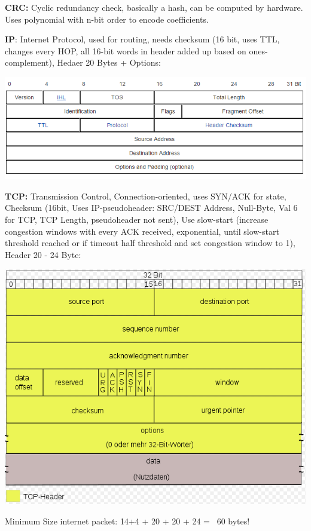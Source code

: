 \textbf{CRC:} Cyclic redundancy check, basically a hash, can be computed by hardware. Uses polynomial with n-bit order to encode coefficients.

\textbf{IP}: Internet Protocol, used for routing, needs checksum (16 bit, uses TTL, changes every HOP, all 16-bit words in header added up based on ones-complement), Hedaer 20 Bytes + Options:

\includegraphics[width=.7\textwidth]{images/chap10/ip_header}

\textbf{TCP:} Transmission Control, Connection-oriented, uses SYN/ACK for state, Checksum (16bit, Uses IP-pseudoheader: SRC/DEST Address, Null-Byte, Val 6 for TCP, TCP Length, pseudoheader not sent), Use slow-start (increase congestion windows with every ACK received, exponential, until slow-start threshold reached or if timeout half threshold and set congestion window to 1), Header 20 - 24 Byte:  

\includegraphics[width=.7\textwidth]{images/chap10/tcp_header}

Minimum Size internet packet: 14+4 + 20 + 20 + 24 = ~60 bytes!